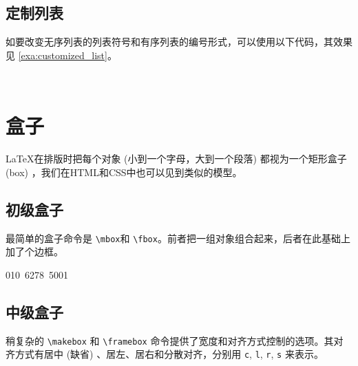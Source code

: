 \subsection{定制列表}

如要改变无序列表的列表符号和有序列表的编号形式，可以使用以下代码，其效果见 \autoref{exa:customized_list}。

\begin{Code}[]
\renewcommand{\labelitemi}{-}
\renewcommand{\theenumi}{\alph{enumi}}
\end{Code}

\renewcommand{\labelitemi}{-}
\renewcommand{\theenumi}{\alph{enumi}}

\begin{example}[htbp]
\\
\caption{定制列表}
\label{exa:customized_list}
\end{example}

\renewcommand{\labelitemi}{\ensuremath{\bullet}}
\renewcommand{\theenumi}{\arabic{enumi}}

\section{盒子}
\label{sec:box}

\LaTeX 在排版时把每个对象 (小到一个字母，大到一个段落) 都视为一个矩形盒子 (box) ，我们在HTML和CSS中也可以见到类似的模型。

\subsection{初级盒子}

最简单的盒子命令是 \verb|\mbox|和 \verb|\fbox|。前者把一组对象组合起来，后者在此基础上加了个边框。

\begin{example}[htbp]
\begin{RLDemo}[]
\mbox{010 6278 5001}
\end{RLDemo}
\caption{ \texttt{mbox}和 \texttt{fbox}}
\label{exa:mbox}
\end{example}

\subsection{中级盒子}

稍复杂的 \verb|\makebox| 和 \verb|\framebox| 命令提供了宽度和对齐方式控制的选项。其对齐方式有居中 (缺省) 、居左、居右和分散对齐，分别用 \texttt{c}, \texttt{l}, \texttt{r}, \texttt{s} 来表示。

